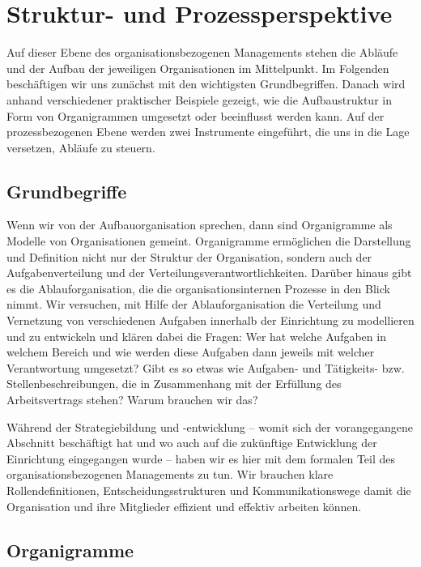 \documentclass[
  letterpaper,
]{book}
\begin{document}
\section{Struktur- und
Prozessperspektive}\label{struktur--und-prozessperspektive}

Auf dieser Ebene des organisationsbezogenen Managements stehen die
Abläufe und der Aufbau der jeweiligen Organisationen im Mittelpunkt. Im
Folgenden beschäftigen wir uns zunächst mit den wichtigsten
Grundbegriffen. Danach wird anhand verschiedener praktischer Beispiele
gezeigt, wie die Aufbaustruktur in Form von Organigrammen umgesetzt oder
beeinflusst werden kann. Auf der prozessbezogenen Ebene werden zwei
Instrumente eingeführt, die uns in die Lage versetzen, Abläufe zu
steuern.

\subsection{Grundbegriffe}\label{grundbegriffe}

Wenn wir von der Aufbauorganisation sprechen, dann sind Organigramme als
Modelle von Organisationen gemeint. Organigramme ermöglichen die
Darstellung und Definition nicht nur der Struktur der Organisation,
sondern auch der Aufgabenverteilung und der
Verteilungsverantwortlichkeiten. Darüber hinaus gibt es die
Ablauforganisation, die die organisationsinternen Prozesse in den Blick
nimmt. Wir versuchen, mit Hilfe der Ablauforganisation die Verteilung
und Vernetzung von verschiedenen Aufgaben innerhalb der Einrichtung zu
modellieren und zu entwickeln und klären dabei die Fragen: Wer hat
welche Aufgaben in welchem Bereich und wie werden diese Aufgaben dann
jeweils mit welcher Verantwortung umgesetzt? Gibt es so etwas wie
Aufgaben- und Tätigkeits- bzw. Stellenbeschreibungen, die in
Zusammenhang mit der Erfüllung des Arbeitsvertrags stehen? Warum
brauchen wir das?

Während der Strategiebildung und -entwicklung -- womit sich der
vorangegangene Abschnitt beschäftigt hat und wo auch auf die zukünftige
Entwicklung der Einrichtung eingegangen wurde -- haben wir es hier mit
dem formalen Teil des organisationsbezogenen Managements zu tun. Wir
brauchen klare Rollendefinitionen, Entscheidungsstrukturen und
Kommunikationswege damit die Organisation und ihre Mitglieder effizient
und effektiv arbeiten können.

\subsection{Organigramme}\label{organigramme}
\end{document}
